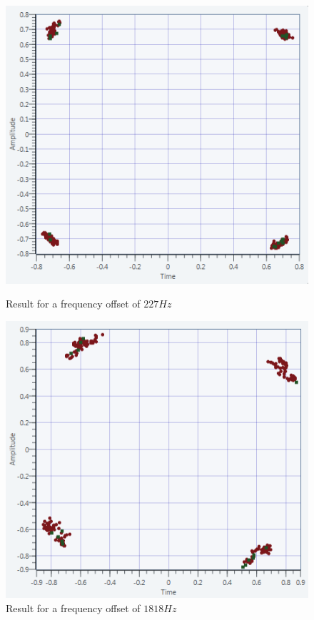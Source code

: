 \documentclass[frenchb, oneside, headings=normal]{scrartcl}
\begin{document}
\begin{figure}[!ht]
  \begin{minipage}[b]{0.48\linewidth}
        \centering \includegraphics[scale=0.5]{img/USRP_carrieroffset_227.PNG}
    \caption{Result for a frequency offset of $227 Hz$}
    \label{fig8}
    \end{minipage}\hfill
    \begin{minipage}[b]{0.48\linewidth}
         \centering \includegraphics[scale=0.5]{img/USRP_carrieroffset_1818.PNG}
          \caption{Result for a frequency offset of $1818 Hz$}
          \label{fig9}
    \end{minipage}
\end{figure}
\end{document}
